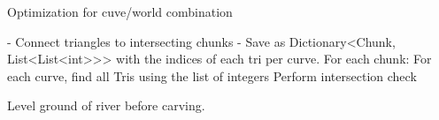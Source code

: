 Optimization for cuve/world combination

- Connect triangles to intersecting chunks
    - Save as Dictionary<Chunk, List<List<int>>> with the indices of each tri per curve.
For each chunk:
    For each curve, find all Tris using the list of integers
    Perform intersection check


Level ground of river before carving.
